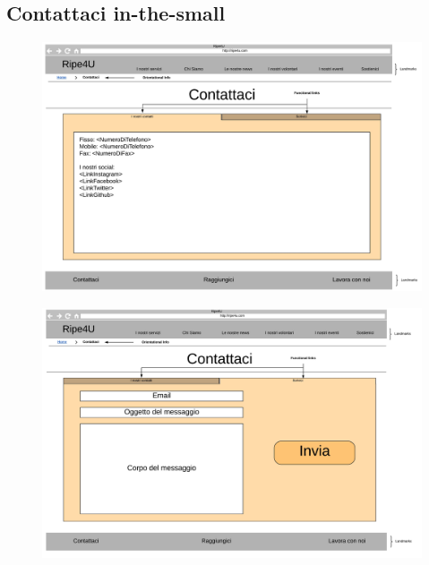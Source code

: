         \subsection{Contattaci in-the-small}
        \begin{figure}[H]
            \centering
            \includegraphics[scale=0.37]{resources/images/contattaci1-in-the-small.jpg}
        \end{figure}
        \begin{figure}[H]
            \centering
            \includegraphics[scale=0.37]{resources/images/contattaci2-in-the-small.jpg}
        \end{figure}


